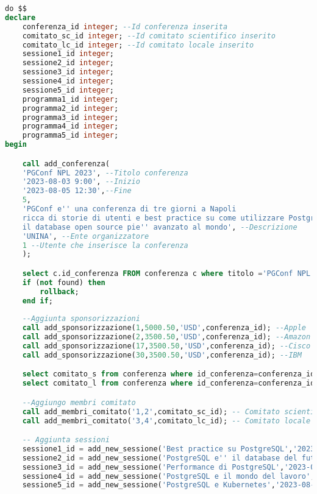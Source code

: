 \begin{lstlisting}[language=SQL, style=mystyle,caption={Conferenza PGConf NPL}]
do $$
declare
	conferenza_id integer; --Id conferenza inserita
	comitato_sc_id integer; --Id comitato scientifico inserito
	comitato_lc_id integer; --Id comitato locale inserito
	sessione1_id integer;
	sessione2_id integer;
	sessione3_id integer;
	sessione4_id integer;
	sessione5_id integer;
	programma1_id integer;
	programma2_id integer;
	programma3_id integer;
	programma4_id integer;
	programma5_id integer;
begin

	call add_conferenza(
	'PGConf NPL 2023', --Titolo conferenza
	'2023-08-03 9:00', --Inizio
	'2023-08-05 12:30',--Fine
	5,
	'PGConf e'' una conferenza di tre giorni a Napoli 
	ricca di storie di utenti e best practice su come utilizzare PostgreSQL, 
	il database open source pie'' avanzato al mondo', --Descrizione
	'UNINA', --Ente organizzatore
	1 --Utente che inserisce la conferenza 
	);

	select c.id_conferenza FROM conferenza c where titolo ='PGConf NPL 2023' and inizio='2023-08-03 9:00' and fine='2023-08-05 12:30' and id_sede=5 into conferenza_id;
	if (not found) then
	    rollback;
	end if;
	
	--Aggiunta sponsorizzazioni
	call add_sponsorizzazione(1,5000.50,'USD',conferenza_id); --Apple
	call add_sponsorizzazione(2,3500.50,'USD',conferenza_id); --Amazon
	call add_sponsorizzazione(17,3500.50,'USD',conferenza_id); --Cisco
	call add_sponsorizzazione(30,3500.50,'USD',conferenza_id); --IBM

	select comitato_s from conferenza where id_conferenza=conferenza_id into comitato_sc_id;
	select comitato_l from conferenza where id_conferenza=conferenza_id into comitato_lc_id;

	--Aggiungo membri comitato
	call add_membri_comitato('1,2',comitato_sc_id); -- Comitato scientifico
	call add_membri_comitato('3,4',comitato_lc_id); -- Comitato locale

	-- Aggiunta sessioni
	sessione1_id = add_new_sessione('Best practice su PostgreSQL','2023-08-03 10:30','2023-08-03 12:30',13,conferenza_id,1);
	sessione2_id = add_new_sessione('PostgreSQL e'' il database del futuro','2023-08-03 14:30','2023-08-03 16:30',14,conferenza_id,2);
	sessione3_id = add_new_sessione('Performance di PostgreSQL','2023-08-04 10:30','2023-08-04 12:30',15,conferenza_id,1);
	sessione4_id = add_new_sessione('PostgreSQL e il mondo del lavoro','2023-08-04 14:30','2023-08-04 18:30',13,conferenza_id,2);
	sessione5_id = add_new_sessione('PostgreSQL e Kubernetes','2023-08-05 10:30','2023-08-05 12:30',14,conferenza_id,1);


\end{lstlisting}
